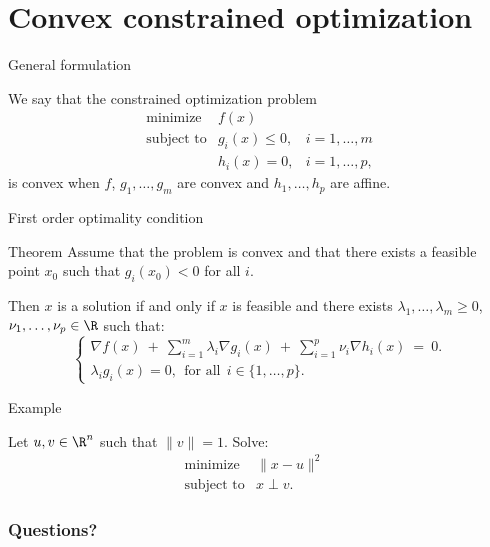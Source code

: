 \documentclass{beamer}
\begin{document}
\section{Convex constrained optimization}


\begin{frame}[t]{General formulation}
	\grid

	We say that the constrained optimization problem
	\begin{equation}
		\begin{array}{lll}
			\text{minimize} & f(x) & \\
			\text{subject to} & g_i(x) \leq 0, & i=1, \dots, m \\
							  & h_i(x) = 0, & i=1, \dots, p,
		\end{array}
	\end{equation}
	is convex when $f$, $g_1, \dots, g_m$ are convex and $h_1, \dots, h_p$ are affine.
\end{frame}

\begin{frame}[t]{First order optimality condition}
	\grid

	\vspace{-0.4cm}
	\begin{block}{Theorem}
		Assume that the problem is convex and that there exists a feasible point $x_0$ such that $g_i(x_0) < 0$ for all $i$.

		Then $x$ is a solution if and only if $x$ is feasible and there exists $\lambda_1, \dots, \lambda_m \geq 0$, $\nu_1, \dots, \nu_p \in \R$ such that:
		$$
		\begin{cases}
			\displaystyle
			\nabla f(x) \ + \ \sum_{i=1}^m \lambda_i \nabla g_i(x) \ + \ \sum_{i=1}^p \nu_i \nabla h_i(x)  \ = \ 0. \\
			\lambda_i g_i(x) = 0, \ \ \text{for all} \ \ i \in \{1, \dots, p\}.
		\end{cases}
		$$
	\end{block}

\end{frame}
\begin{frame}[t]{Example}
	\grid

	Let $u,v \in \R^n$ such that $\|v\|=1$. Solve:
	\begin{equation}
		\begin{array}{lll}
			\text{minimize} & \|x-u\|^2 & \\
			\text{subject to} & x \perp v.
		\end{array}
	\end{equation}

	\pause


\end{frame}

\appendix
\backupbegin
\begin{frame}[t]
	\frametitle{Questions?}
	\grid

	\pause
\end{frame}
\backupend
\end{document}
